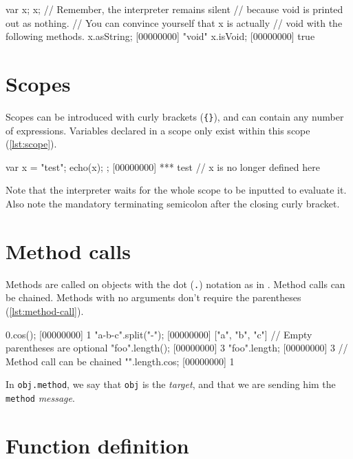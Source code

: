 \documentclass[openright,twoside,12pt]{report}
\begin{document}
\begin{urbiscript}[caption=Variables initialization defaults to
  nil,label=lst:local-uninit]
var x;
x;
// Remember, the interpreter remains silent
// because void is printed out as nothing.
// You can convince yourself that x is actually
// void with the following methods.
x.asString;
[00000000] "void"
x.isVoid;
[00000000] true
\end{urbiscript}

\section{Scopes}

Scopes can be introduced with curly brackets (\texttt{\{\}}), and can
contain any number of expressions. Variables declared in a scope only
exist within this scope (\autoref{lst:scope}).

\begin{urbiscript}[caption=Scoping a variable,label=lst:scope]
{
  var x = "test";
  echo(x);
};
[00000000] *** test
// x is no longer defined here
\end{urbiscript}

Note that the interpreter waits for the whole scope to be inputted to
evaluate it. Also note the mandatory terminating semicolon after the
closing curly bracket.

\section{Method calls}

Methods are called on objects with the dot (\texttt{.}) notation as in
\Cxx. Method calls can be chained. Methods with no arguments don't
require the parentheses (\autoref{lst:method-call}).

\begin{urbiscript}[caption=Calling methods,label=lst:method-call]
0.cos();
[00000000] 1
"a-b-c".split("-");
[00000000] ["a", "b", "c"]
// Empty parentheses are optional
"foo".length();
[00000000] 3
"foo".length;
[00000000] 3
// Method call can be chained
"".length.cos;
[00000000] 1
\end{urbiscript}

In \lstinline|obj.method|, we say that \texttt{obj} is the {\em
  target}, and that we are sending him the \texttt{method} {\em
  message}.

\section{Function definition}
\end{document}
